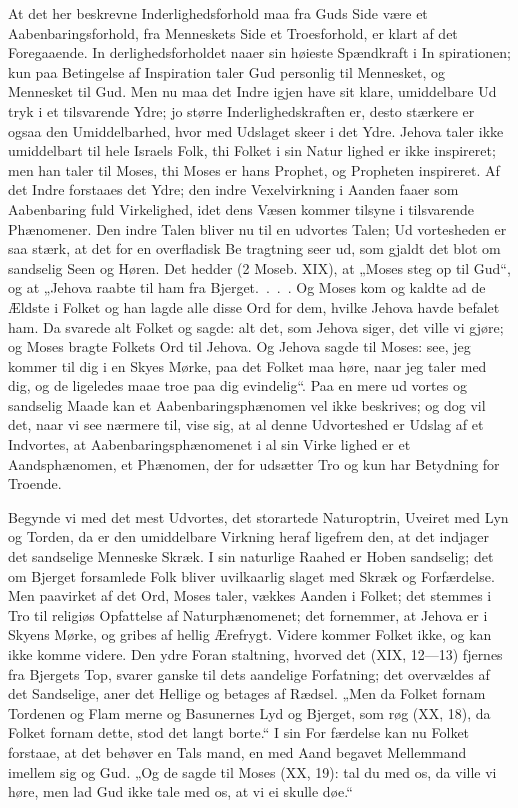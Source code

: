 \documentclass[12pt]{book}
\newcommand{\opage}[1]{\marginnote{\footnotesize\textit{[#1]}}}
\begin{document}
At det her beskrevne Inderlighedsforhold maa fra
Guds Side være et Aabenbaringsforhold, fra Menneskets
Side et Troesforhold, er klart af det Foregaaende. In\-%
derlighedsforholdet naaer sin høieste Spændkraft i In\-%
spirationen; kun paa Betingelse af Inspiration taler Gud
personlig til Mennesket, og Mennesket til Gud. Men
nu maa det Indre igjen have sit klare, umiddelbare Ud\-%
tryk i et tilsvarende Ydre; jo større Inderlighedskraften
er, desto stærkere er ogsaa den Umiddelbarhed, hvor\-%
med Udslaget skeer i det Ydre. Jehova taler ikke
\opage{188}\setcounter{footnote}{0}%
umiddelbart til hele Israels Folk, thi Folket i sin Natur\-%
lighed er ikke inspireret; men han taler til Moses, thi
Moses er hans Prophet, og Propheten inspireret. Af
det Indre forstaaes det Ydre; den indre Vexelvirkning
i Aanden faaer som Aabenbaring fuld Virkelighed, idet
dens Væsen kommer tilsyne i tilsvarende Phænomener.
Den indre Talen bliver nu til en udvortes Talen; Ud\-%
vortesheden er saa stærk, at det for en overfladisk Be\-%
tragtning seer ud, som gjaldt det blot om sandselig
Seen og Høren. Det hedder (2 Moseb. XIX), at
„Moses steg op til Gud“, og at „Jehova raabte til ham
fra Bjerget.~.~.~. Og Moses kom og kaldte ad de Ældste
i Folket og han lagde alle disse Ord for dem, hvilke
Jehova havde befalet ham. Da svarede alt Folket og
sagde: alt det, som Jehova siger, det ville vi gjøre; og
Moses bragte Folkets Ord til Jehova. Og Jehova sagde
til Moses: see, jeg kommer til dig i en Skyes Mørke,
paa det Folket maa høre, naar jeg taler med dig, og de
ligeledes maae troe paa dig evindelig“. Paa en mere ud\-%
vortes og sandselig Maade kan et Aabenbaringsphænomen
vel ikke beskrives; og dog vil det, naar vi see nærmere
til, vise sig, at al denne Udvorteshed er Udslag af et
Indvortes, at Aabenbaringsphænomenet i al sin Virke\-%
lighed er et Aandsphænomen, et Phænomen, der for\-%
udsætter Tro og kun har Betydning for Troende.

Begynde vi med det mest Udvortes, det storartede
Naturoptrin, Uveiret med Lyn og Torden, da er den
umiddelbare Virkning heraf ligefrem den, at det indjager
det sandselige Menneske Skræk. I sin naturlige Raahed
er Hoben sandselig; det om Bjerget forsamlede Folk
bliver uvilkaarlig slaget med Skræk og Forfærdelse.
Men paavirket af det Ord, Moses taler, vækkes Aanden
i Folket; det stemmes i Tro til religiøs Opfattelse af
Naturphænomenet; det fornemmer, at Jehova er i Skyens
\opage{189}\setcounter{footnote}{0}%
Mørke, og gribes af hellig Ærefrygt. Videre kommer
Folket ikke, og kan ikke komme videre. Den ydre Foran\-%
staltning, hvorved det (XIX, 12---13) fjernes fra Bjergets
Top, svarer ganske til dets aandelige Forfatning; det
overvældes af det Sandselige, aner det Hellige og betages
af Rædsel. „Men da Folket fornam Tordenen og Flam\-%
merne og Basunernes Lyd og Bjerget, som røg (XX, 18),
da Folket fornam dette, stod det langt borte.“ I sin For\-%
færdelse kan nu Folket forstaae, at det behøver en Tals\-%
mand, en med Aand begavet Mellemmand imellem sig
og Gud. „Og de sagde til Moses (XX, 19): tal du med
os, da ville vi høre, men lad Gud ikke tale med os, at
vi ei skulle døe.“
\end{document}
